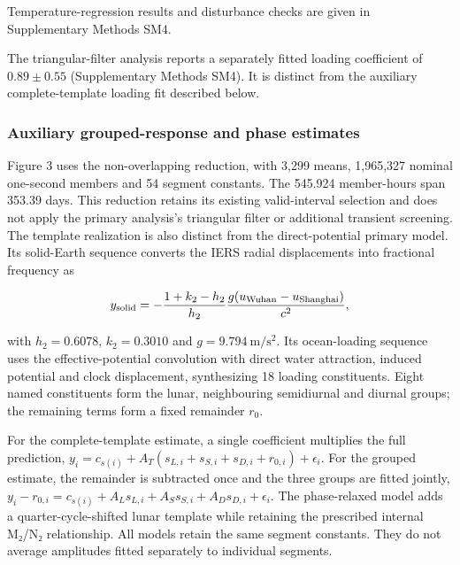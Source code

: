 \documentclass[
  11pt,
  a4paper,
]{article}
\begin{document}
Temperature-regression results and disturbance checks are given in
Supplementary Methods SM4.

The triangular-filter analysis reports a separately fitted loading
coefficient of \(0.89\pm0.55\) (Supplementary Methods SM4). It is
distinct from the auxiliary complete-template loading fit described
below.

\hypertarget{auxiliary-grouped-response-and-phase-estimates}{%
\subsubsection{Auxiliary grouped-response and phase
estimates}\label{auxiliary-grouped-response-and-phase-estimates}}

Figure 3 uses the non-overlapping reduction, with 3,299 means, 1,965,327
nominal one-second members and 54 segment constants. The 545.924
member-hours span 353.39 days. This reduction retains its existing
valid-interval selection and does not apply the primary analysis's
triangular filter or additional transient screening. The template
realization is also distinct from the direct-potential primary model.
Its solid-Earth sequence converts the IERS radial displacements into
fractional frequency as

\[
y_{\rm solid}=-\frac{1+k_2-h_2}{h_2}\frac{g(u_{\rm Wuhan}-u_{\rm Shanghai})}{c^2},
\]

with \(h_2=0.6078\), \(k_2=0.3010\) and \(g=9.794\ \mathrm{m/s^2}\). Its
ocean-loading sequence uses the effective-potential convolution with
direct water attraction, induced potential and clock displacement,
synthesizing 18 loading constituents. Eight named constituents form the
lunar, neighbouring semidiurnal and diurnal groups; the remaining terms
form a fixed remainder \(r_0\).

For the complete-template estimate, a single coefficient multiplies the
full prediction,
\(y_i=c_{s(i)}+A_T(s_{L,i}+s_{S,i}+s_{D,i}+r_{0,i})+\epsilon_i\). For
the grouped estimate, the remainder is subtracted once and the three
groups are fitted jointly,
\(y_i-r_{0,i}=c_{s(i)}+A_Ls_{L,i}+A_Ss_{S,i}+A_Ds_{D,i}+\epsilon_i\).
The phase-relaxed model adds a quarter-cycle-shifted lunar template
while retaining the prescribed internal M₂/N₂ relationship. All models
retain the same segment constants. They do not average amplitudes fitted
separately to individual segments.
\end{document}
